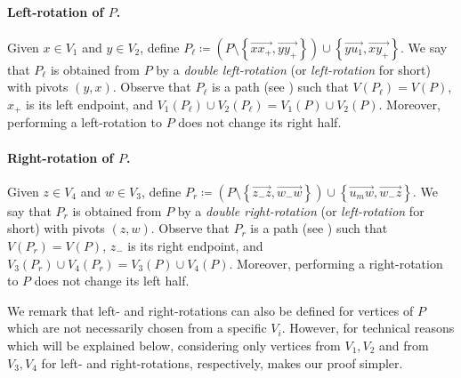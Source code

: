 \documentclass{article}
\begin{document}
	\paragraph*{Left-rotation of $P$.}
	Given $x\in V_1$ and $y\in V_2$, define $P_{\ell} \coloneqq \left(P\setminus \left\{\overrightarrow{xx_+},\overrightarrow{yy_+}\right\} \right)\cup\left\{\overrightarrow{yu_1},\overrightarrow{xy_+}\right\}$.
	We say that $P_{\ell}$ is obtained from $P$ by a \emph{double left-rotation} (or \emph{left-rotation} for short) with pivots $(y,x)$. 
	Observe that $P_{\ell}$ is a path (see ) such that $V(P_{\ell})=V(P)$, $x_+$ is its left endpoint, and $V_1(P_{\ell})\cup V_2(P_{\ell})=V_1(P)\cup V_2(P)$.
	Moreover, performing a left-rotation to $P$ does not change its right half.
	
	\paragraph*{Right-rotation of $P$.}
	Given $z \in V_4$ and $w \in V_3$, define $P_r \coloneqq \left(P \setminus \left\{\overrightarrow{z_-z}, \overrightarrow{w_-w}\right\} \right) \cup \left\{\overrightarrow{u_mw},\overrightarrow{w_-z} \right\}$.
	We say that $P_r$ is obtained from $P$ by a \emph{double right-rotation} (or \emph{left-rotation} for short) with pivots $(z,w)$.
	Observe that $P_r$ is a path (see ) such that $V(P_r) = V(P)$, $z_-$ is its right endpoint, and $V_3(P_r) \cup V_4(P_r) = V_3(P) \cup V_4(P)$.
	Moreover, performing a right-rotation to $P$ does not change its left half.
	
	\begin{remark}
		We remark that left- and right-rotations can also be defined for vertices of $P$ which are not necessarily chosen from a specific $V_i$.
		However, for technical reasons which will be explained below, considering only vertices from $V_1, V_2$ and from $V_3, V_4$ for left- and right-rotations, respectively, makes our proof simpler.
	\end{remark}
	
\end{document}
